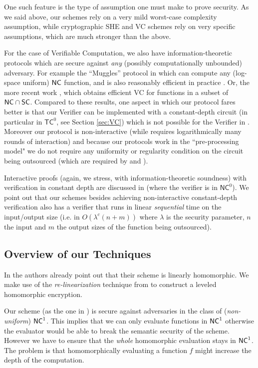 One such feature is the type of assumption one must make to prove security. As we said above, our schemes rely on a very mild worst-case complexity assumption, while cryptographic SHE and VC schemes rely on very specific assumptions, which are much stronger than the above. 

For the case of Verifiable Computation, we also have information-theoretic
protocols which are secure against {\em any} (possibly computationally unbounded) adversary. For example the ``Muggles'' protocol in \cite{muggles} which 
can compute any (log-space uniform) ${\mathsf{NC}}$ function, 
and is also reasonably efficient
in practice \cite{CMT}.
Or, the more recent work \cite{grlocally}, which obtains efficient VC for functions in a subset of ${\mathsf{NC}} \cap {\ensuremath{\mathsf{SC}}}$.
Compared to these results, one aspect in which our protocol fares better  is that
our Verifier can be implemented with a constant-depth circuit (in particular in 
$\mathsf{TC}^0$, see Section \ref{sec:VC}) which is not possible for the Verifier in \cite{muggles,grlocally}. Moreover our protocol is non-interactive (while \cite{muggles,grlocally} requires
logarithmically many rounds of interaction) and because our protocols work in the ``pre-processing model" we do not require any uniformity or regularity condition on the circuit being outsourced (which are required by \cite{muggles} and \cite{CMT}). 

Interactive proofs (again, we stress, with information-theoretic soundness) with verification in constant depth are discussed in \cite{gghkr07} (where the verifier is in 
$\mathsf{NC}^0$). We point out that our schemes besides achieving non-interactive constant-depth verification also has a verifier that runs in linear {\em sequential} time on the input/output size (i.e. in $O(\lambda^c(n+m))$ where $\lambda$ is the security parameter, $n$ the input and $m$ the output sizes of the function being outsourced). 


\subsection{Overview of our Techniques}

In \cite{fgcrypto} the authors already point out that their scheme is 
linearly homomorphic. We make use of the {\em re-linearization} technique 
from \cite{fhe-lwe} to construct a leveled homomorphic encryption. 

Our scheme (as the one in \cite{fgcrypto}) is secure against adversaries in the class of (\textit{non-uniform}) ${\mathsf{NC}}^1$. This implies that we can only evaluate functions in ${\mathsf{NC}}^1$ otherwise the evaluator would be able to break the semantic security of the scheme.
However we have to ensure that the \textit{whole} homomorphic evaluation stays in ${\mathsf{NC}}^1$. The problem is that homomorphically evaluating a function $f$ might 
increase the depth of the computation. 

